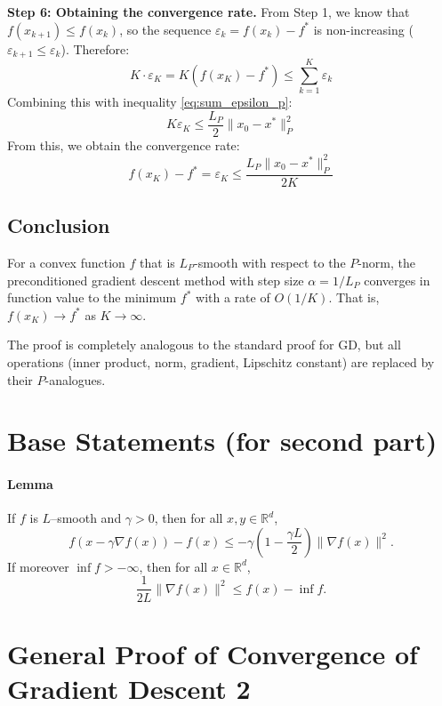\documentclass{article}
\newcommand{\normp}[1]{\|#1\|_P}       %
\begin{document}
\textbf{Step 6: Obtaining the convergence rate.}
From Step 1, we know that $f(x_{k+1}) \le f(x_k)$, so the sequence $\varepsilon_k = f(x_k) - f^*$ is non-increasing ($\varepsilon_{k+1} \le \varepsilon_k$). Therefore:
\begin{equation*}
    K \cdot \varepsilon_K = K (f(x_K) - f^*) \le \sum_{k=1}^{K} \varepsilon_k
\end{equation*}
Combining this with inequality \eqref{eq:sum_epsilon_p}:
\begin{equation*}
    K \varepsilon_K \le \frac{L_P}{2} \normp{x_0 - x^*}^2
\end{equation*}
From this, we obtain the convergence rate:
\begin{equation} \label{eq:convergence_rate_p}
    f(x_K) - f^* = \varepsilon_K \le \frac{L_P \normp{x_0 - x^*}^2}{2 K}
\end{equation}

\subsection*{Conclusion}
For a convex function $f$ that is $L_P$-smooth with respect to the $P$-norm, the preconditioned gradient descent method with step size $\alpha = 1/L_P$ converges in function value to the minimum $f^*$ with a rate of $O(1/K)$. That is, $f(x_K) \to f^*$ as $K \to \infty$.

The proof is completely analogous to the standard proof for GD, but all operations (inner product, norm, gradient, Lipschitz constant) are replaced by their $P$-analogues.

\section*{Base Statements (for second part)}

\paragraph{Lemma}
If $f$ is $L$–smooth and $\gamma > 0$, then for all $x, y \in \mathbb{R}^d$,
\[
f(x - \gamma \nabla f(x)) - f(x) \le -\gamma \left(1 - \frac{\gamma L}{2} \right) \|\nabla f(x)\|^2. \tag{10}
\]
If moreover $\inf f > -\infty$, then for all $x \in \mathbb{R}^d$,
\[
\frac{1}{2L} \|\nabla f(x)\|^2 \le f(x) - \inf f.
\]



\section*{General Proof of Convergence of Gradient Descent 2}
\end{document}
